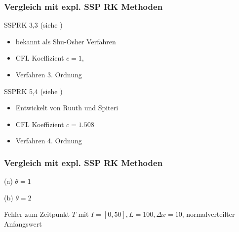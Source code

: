 \begin{frame}[<+->]
\frametitle{Vergleich mit expl. SSP RK Methoden}
\centering
\begin{block}{SSPRK 3,3 (siehe \cite[S. 110]{gottlieb2005high})}
\begin{itemize}
 \item bekannt als Shu-Osher Verfahren
 \item CFL Koeffizient $c =1$, 
 \item Verfahren 3. Ordnung
\end{itemize}
\end{block}
\begin{block}{SSPRK 5,4 (siehe \cite[S. 111]{gottlieb2005high})}
\begin{itemize}
 \item Entwickelt von Ruuth und Spiteri
 \item CFL Koeffizient $c =1.508$
 \item Verfahren 4. Ordnung
\end{itemize}
\end{block}
\end{frame}

\begin{frame}[<+->]
\frametitle{Vergleich mit expl. SSP RK Methoden}
\centering
\begin{minipage}[b]{0.45\linewidth}
 \centering
 
(a) $\theta=1$
\end{minipage}
\begin{minipage}[b]{0.45\linewidth}
 \centering

(b) $\theta=2$
\end{minipage}
Fehler zum Zeitpunkt $T$ mit $I=[0,50], L=100,\Delta x = 10$, normalverteilter Anfangswert
\end{frame}